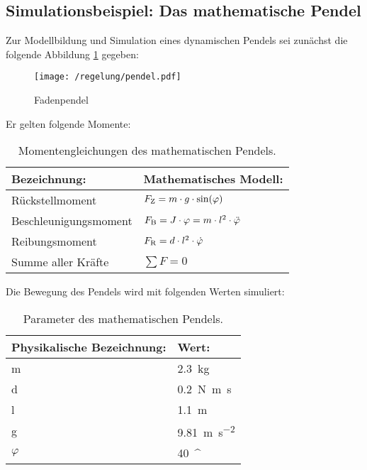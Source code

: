 \subsection{Simulationsbeispiel: Das mathematische Pendel}

Zur Modellbildung und Simulation eines dynamischen Pendels sei zunächst die folgende Abbildung \ref{fig:pendel} gegeben:

\newpage

\begin{figure}[h]
	\centering
	\texttt{[image: /regelung/pendel.pdf]}
	\label{fig:pendel}
	\caption{Fadenpendel}
\end{figure}

Er gelten folgende Momente:

	\begin{table}[h!]
	\centering
	\caption{Momentengleichungen des mathematischen Pendels.}
	\begin{tabular}{ll}
		\toprule
		Bezeichnung:				&	Mathematisches Modell: \\
		\midrule
		Rückstellmoment				&	$F_\i{Z} = m \cdot g \cdot \si{sin}(\varphi) \label{rueckstellmoment}$ \\
		Beschleunigungsmoment		&	$F_\i{B} = J \cdot \varphi = m \cdot l^{2} \cdot \ddot\varphi\label{beschleunigungsmoment} $ \\
		Reibungsmoment				&	$F_\i{R} = d \cdot l^{2} \cdot \dot\varphi\label{reibungsmoment} $ \\
		Summe aller Kräfte			&	$\sum F = 0 \label{momentengleichgewicht} $ \\
		\bottomrule 
	\end{tabular}
\end{table}

Die Bewegung des Pendels wird mit folgenden Werten simuliert:

\begin{table}[h!]
	\centering
	\caption{Parameter des mathematischen Pendels.}
	\begin{tabular}{ll}
		\toprule
		Physikalische Bezeichnung:	& Wert: \\
		\midrule
		m		& \SI{2,3}{\kilogram} \\
		d		& \SI{0,2}{\newton\meter\second} \\
		l		& \SI{1,1}{\meter} \\
		g		& \SI{9,81}{\meter\per\square\second}\\
		$\varphi$ & \SI{40}{^\circ}\\
		\bottomrule
	\end{tabular}
\end{table}
	
